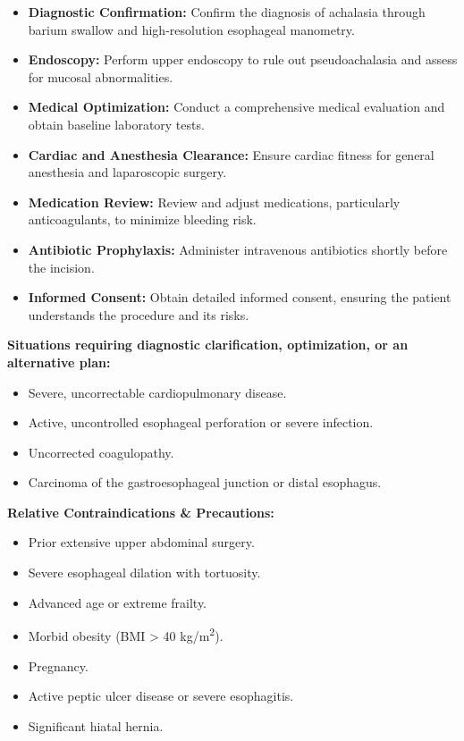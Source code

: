 \begin{itemize}
  \item \textbf{Diagnostic Confirmation:} Confirm the diagnosis of achalasia through barium swallow and high-resolution esophageal manometry.
  \item \textbf{Endoscopy:} Perform upper endoscopy to rule out pseudoachalasia and assess for mucosal abnormalities.
  \item \textbf{Medical Optimization:} Conduct a comprehensive medical evaluation and obtain baseline laboratory tests.
  \item \textbf{Cardiac and Anesthesia Clearance:} Ensure cardiac fitness for general anesthesia and laparoscopic surgery.
  \item \textbf{Medication Review:} Review and adjust medications, particularly anticoagulants, to minimize bleeding risk.
  \item \textbf{Antibiotic Prophylaxis:} Administer intravenous antibiotics shortly before the incision.
  \item \textbf{Informed Consent:} Obtain detailed informed consent, ensuring the patient understands the procedure and its risks.
\end{itemize}

\textbf{Situations requiring diagnostic clarification, optimization, or an alternative plan:}
\begin{itemize}
  \item Severe, uncorrectable cardiopulmonary disease.
  \item Active, uncontrolled esophageal perforation or severe infection.
  \item Uncorrected coagulopathy.
  \item Carcinoma of the gastroesophageal junction or distal esophagus.
\end{itemize}

\textbf{Relative Contraindications \& Precautions:}
\begin{itemize}
  \item Prior extensive upper abdominal surgery.
  \item Severe esophageal dilation with tortuosity.
  \item Advanced age or extreme frailty.
  \item Morbid obesity (BMI > 40 kg/m\textsuperscript{2}).
  \item Pregnancy.
  \item Active peptic ulcer disease or severe esophagitis.
  \item Significant hiatal hernia.
\end{itemize}


